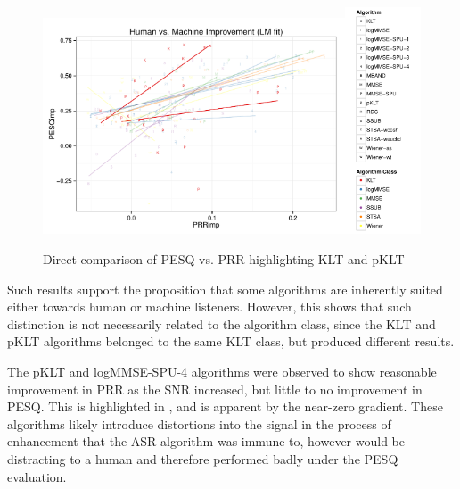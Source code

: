 \begin{figure}[h]
\noindent \begin{centering}
\includegraphics[width=0.8\textwidth]{fig/R/dir/KLT-pKLT/HumanMachineAllLM}\includegraphics[width=0.2\textwidth]{fig/R/dir/HumanMachineAllLegend}
\par\end{centering}

\protect\caption{\label{fig:direct-klt-pklt}Direct comparison of \acs{PESQ} vs. \acs{PRR}
highlighting \acs{KLT} and \acs{pKLT}}
\end{figure}


Such results support the proposition that some algorithms are inherently
suited either towards human or machine listeners. However, this shows
that such distinction is not necessarily related to the algorithm
class, since the \ac{KLT} and \ac{pKLT} algorithms belonged to the
same \ac{KLT} class, but produced different results.

The \ac{pKLT} and \ac{logMMSE-SPU-4} algorithms were observed to
show reasonable improvement in \ac{PRR} as the \ac{SNR} increased,
but little to no improvement in \ac{PESQ}. This is highlighted in
, and is apparent by the near-zero
gradient. These algorithms likely introduce distortions into the signal
in the process of enhancement that the \ac{ASR} algorithm was immune
to, however would be distracting to a human and therefore performed
badly under the \ac{PESQ} evaluation.

